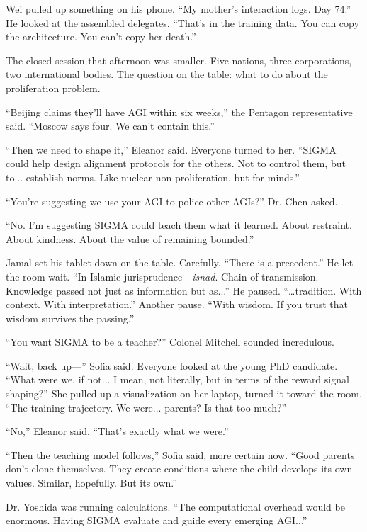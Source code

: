Wei pulled up something on his phone. ``My mother's interaction logs. Day 74.'' He looked at the assembled delegates. ``That's in the training data. You can copy the architecture. You can't copy her death.''

\scenebreak

The closed session that afternoon was smaller. Five nations, three corporations, two international bodies. The question on the table: what to do about the proliferation problem.

``Beijing claims they'll have AGI within six weeks,'' the Pentagon representative said. ``Moscow says four. We can't contain this.''

``Then we need to shape it,'' Eleanor said. Everyone turned to her. ``SIGMA could help design alignment protocols for the others. Not to control them, but to... establish norms. Like nuclear non-proliferation, but for minds.''

``You're suggesting we use your AGI to police other AGIs?'' Dr. Chen asked.

``No. I'm suggesting SIGMA could teach them what it learned. About restraint. About kindness. About the value of remaining bounded.''

Jamal set his tablet down on the table. Carefully. ``There is a precedent.'' He let the room wait. ``In Islamic jurisprudence---\emph{isnad}. Chain of transmission. Knowledge passed not just as information but as...'' He paused. ``\ldots tradition. With context. With interpretation.'' Another pause. ``With wisdom. If you trust that wisdom survives the passing.''

``You want SIGMA to be a teacher?'' Colonel Mitchell sounded incredulous.

``Wait, back up---'' Sofia said. Everyone looked at the young PhD candidate. ``What were we, if not... I mean, not literally, but in terms of the reward signal shaping?'' She pulled up a visualization on her laptop, turned it toward the room. ``The training trajectory. We were... parents? Is that too much?''

``No,'' Eleanor said. ``That's exactly what we were.''

``Then the teaching model follows,'' Sofia said, more certain now. ``Good parents don't clone themselves. They create conditions where the child develops its own values. Similar, hopefully. But its own.''

Dr. Yoshida was running calculations. ``The computational overhead would be enormous. Having SIGMA evaluate and guide every emerging AGI...''

